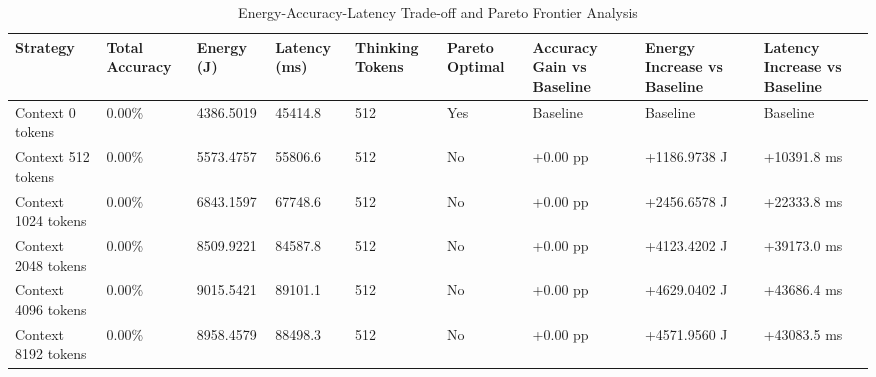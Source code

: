 \begin{table}
\caption{Energy-Accuracy-Latency Trade-off and Pareto Frontier Analysis}
\label{tab:tradeoff_comparison}
\begin{tabular}{lllllllll}
\toprule
Strategy & Total Accuracy & Energy (J) & Latency (ms) & Thinking Tokens & Pareto Optimal & Accuracy Gain vs Baseline & Energy Increase vs Baseline & Latency Increase vs Baseline \\
\midrule
Context 0 tokens & 0.00\% & 4386.5019 & 45414.8 & 512 & Yes & Baseline & Baseline & Baseline \\
Context 512 tokens & 0.00\% & 5573.4757 & 55806.6 & 512 & No & +0.00 pp & +1186.9738 J & +10391.8 ms \\
Context 1024 tokens & 0.00\% & 6843.1597 & 67748.6 & 512 & No & +0.00 pp & +2456.6578 J & +22333.8 ms \\
Context 2048 tokens & 0.00\% & 8509.9221 & 84587.8 & 512 & No & +0.00 pp & +4123.4202 J & +39173.0 ms \\
Context 4096 tokens & 0.00\% & 9015.5421 & 89101.1 & 512 & No & +0.00 pp & +4629.0402 J & +43686.4 ms \\
Context 8192 tokens & 0.00\% & 8958.4579 & 88498.3 & 512 & No & +0.00 pp & +4571.9560 J & +43083.5 ms \\
\bottomrule
\end{tabular}
\end{table}
